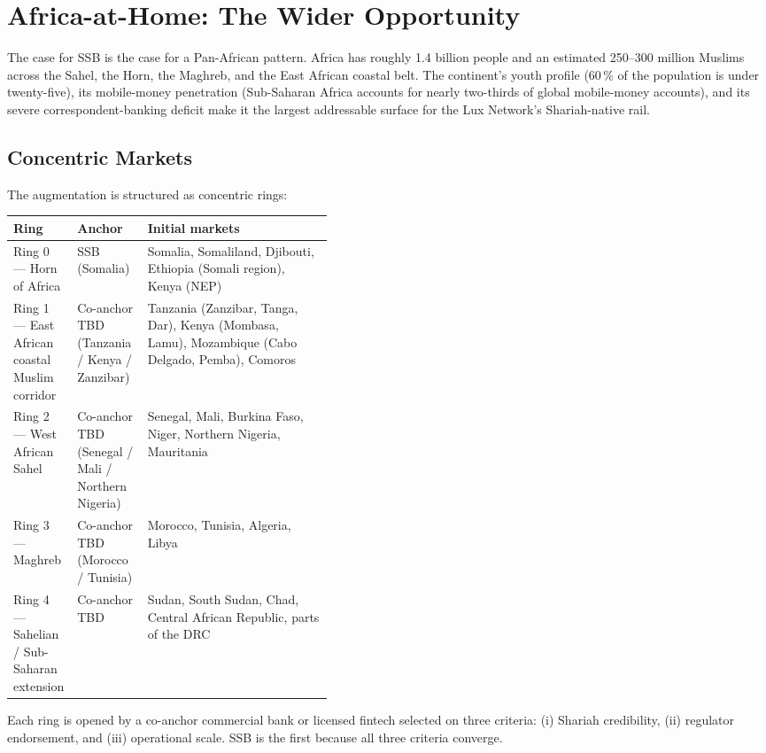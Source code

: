 \documentclass[11pt,letterpaper]{article}
\begin{document}
\section{Africa-at-Home: The Wider Opportunity}

The case for SSB is the case for a Pan-African pattern. Africa has
roughly 1.4 billion people and an estimated 250--300 million Muslims
across the Sahel, the Horn, the Maghreb, and the East African coastal
belt. The continent's youth profile (60\,\% of the population is under
twenty-five), its mobile-money penetration (Sub-Saharan Africa
accounts for nearly two-thirds of global mobile-money accounts), and
its severe correspondent-banking deficit make it the largest
addressable surface for the Lux Network's Shariah-native rail.

\subsection{Concentric Markets}
The augmentation is structured as concentric rings:

\begin{tabularx}{\linewidth}{p{0.20\linewidth} p{0.22\linewidth} Y}
\toprule
\textbf{Ring} & \textbf{Anchor} & \textbf{Initial markets} \\
\midrule
Ring 0 --- Horn of Africa & SSB (Somalia) & Somalia, Somaliland,
Djibouti, Ethiopia (Somali region), Kenya (NEP) \\[0.3em]
Ring 1 --- East African coastal Muslim corridor & Co-anchor TBD
(Tanzania / Kenya / Zanzibar) & Tanzania (Zanzibar, Tanga, Dar),
Kenya (Mombasa, Lamu), Mozambique (Cabo Delgado, Pemba),
Comoros \\[0.3em]
Ring 2 --- West African Sahel & Co-anchor TBD (Senegal / Mali /
Northern Nigeria) & Senegal, Mali, Burkina Faso, Niger, Northern
Nigeria, Mauritania \\[0.3em]
Ring 3 --- Maghreb & Co-anchor TBD (Morocco / Tunisia) & Morocco,
Tunisia, Algeria, Libya \\[0.3em]
Ring 4 --- Sahelian / Sub-Saharan extension & Co-anchor TBD &
Sudan, South Sudan, Chad, Central African Republic, parts of
the DRC \\
\bottomrule
\end{tabularx}

\vspace{0.5em}

Each ring is opened by a co-anchor commercial bank or licensed fintech
selected on three criteria: (i) Shariah credibility, (ii) regulator
endorsement, and (iii) operational scale. SSB is the first because all
three criteria converge.
\end{document}
